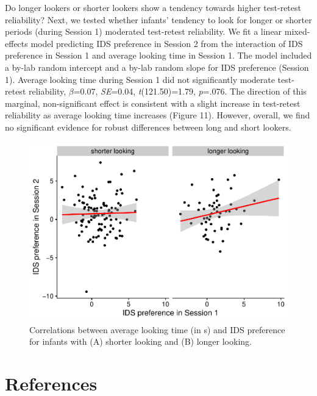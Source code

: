 \documentclass[
  english,
  man, donotrepeattitle,floatsintext]{apa6}
\begin{document}
Do longer lookers or shorter lookers show a tendency towards higher test-retest reliability?
Next, we tested whether infants' tendency to look for longer or shorter periods (during Session 1) moderated test-retest reliability.
We fit a linear mixed-effects model predicting IDS preference in Session 2 from the interaction of IDS preference in Session 1 and average looking time in Session 1. The model included a by-lab random intercept and a by-lab random slope for IDS preference (Session 1). Average looking time during Session 1 did not significantly moderate test-retest reliability, \(\beta\)=0.07, \emph{SE}=0.04, \emph{t}(121.50)=1.79, \emph{p}=.076. The direction of this marginal, non-significant effect is consistent with a slight increase in test-retest reliability as average looking time increases (Figure 11). However, overall, we find no significant evidence for robust differences between long and short lookers.

\begin{figure}

{\centering \includegraphics{MB1T_supplement_files/figure-latex/sfig11-1} 

}

\caption{Correlations between average looking time (in s) and IDS preference for infants with (A) shorter looking and (B) longer looking.}\label{fig:sfig11}
\end{figure}

\newpage

\hypertarget{references}{%
\section{References}\label{references}}
\end{document}
